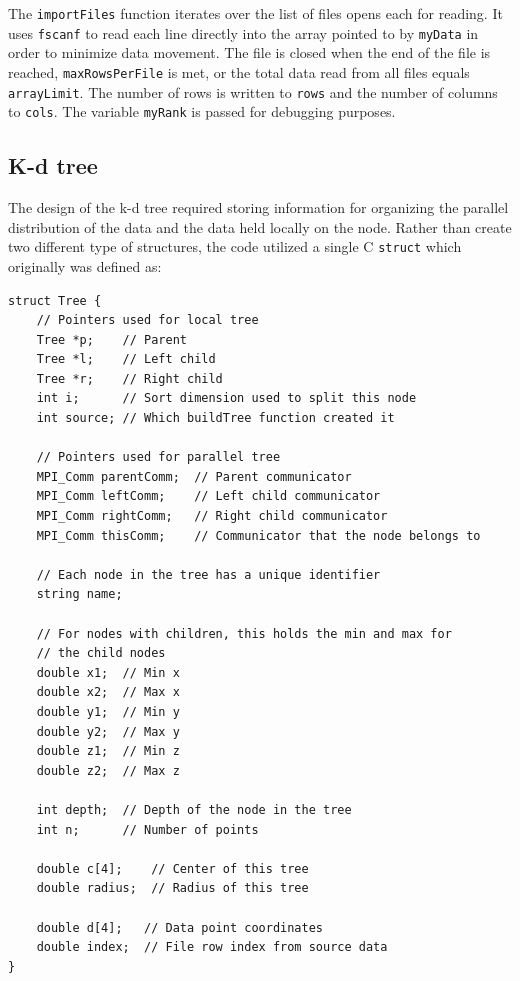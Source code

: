 \documentclass{article}
\begin{document}
The \texttt{importFiles} function iterates over the list of files opens each for reading. It uses \texttt{fscanf} to read each line directly into the array pointed to by \texttt{myData} in order to minimize data movement. The file is closed when the end of the file is reached, \texttt{maxRowsPerFile} is met, or the total data read from all files equals \texttt{arrayLimit}. The number of rows is written to \texttt{rows} and the number of columns to \texttt{cols}. The variable \texttt{myRank} is passed for debugging purposes.





%
%

\subsection{K-d tree}
%
%

The design of the k-d tree required storing information for organizing the parallel distribution of the data and the data held locally on the node. Rather than create two different type of structures, the code utilized a single C \texttt{struct} which originally was defined as:

\begin{minipage}{\linewidth}
\lstset{language=C++, keepspaces=true}
\begin{lstlisting}
struct Tree {
    // Pointers used for local tree
	Tree *p;    // Parent
	Tree *l;    // Left child
	Tree *r;    // Right child
	int i;      // Sort dimension used to split this node
	int source; // Which buildTree function created it

    // Pointers used for parallel tree
	MPI_Comm parentComm;  // Parent communicator
	MPI_Comm leftComm;    // Left child communicator
	MPI_Comm rightComm;   // Right child communicator
	MPI_Comm thisComm;    // Communicator that the node belongs to

    // Each node in the tree has a unique identifier
	string name;

    // For nodes with children, this holds the min and max for
    // the child nodes
	double x1;  // Min x
	double x2;  // Max x
	double y1;  // Min y
	double y2;  // Max y
	double z1;  // Min z
	double z2;  // Max z

	int depth;  // Depth of the node in the tree
	int n;      // Number of points

	double c[4];    // Center of this tree
	double radius;  // Radius of this tree

	double d[4];   // Data point coordinates
	double index;  // File row index from source data
}
\end{lstlisting}
\end{minipage}
\end{document}
